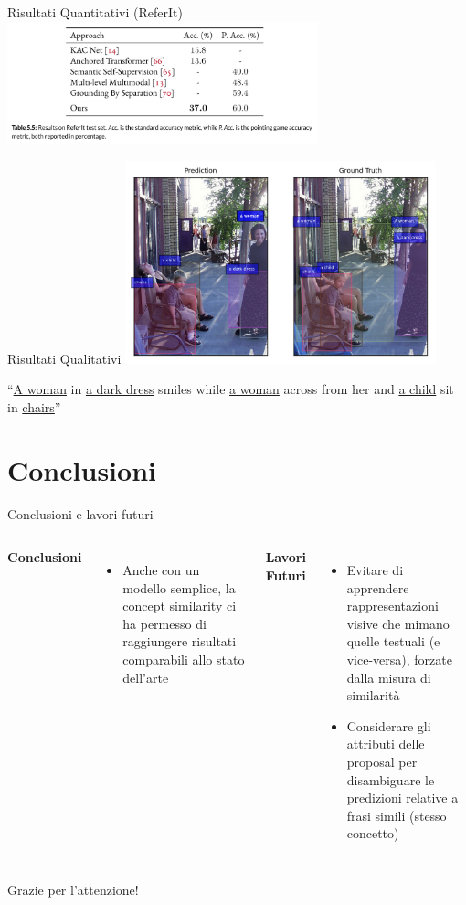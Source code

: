 \documentclass{beamer}
\begin{document}
\begin{frame}{Risultati Quantitativi (ReferIt)}
  \centering
  \includegraphics[width=9cm]{images/referit-results.png}
\end{frame}

\begin{frame}{Risultati Qualitativi}
  \centering
  \includegraphics[width=9cm]{images/similing-woman.png}
  
  ``\underline{A woman} in \underline{a dark dress} smiles while
  \underline{a woman} across from her and \underline{a child} sit in
  \underline{chairs}''
\end{frame}

\section{Conclusioni}

\begin{frame}{Conclusioni e lavori futuri}
  \begin{columns}
      \textbf{Conclusioni}
      \begin{itemize}
        \item Anche con un \alert{modello semplice}, la concept
        similarity ci ha permesso di raggiungere \alert{risultati
        comparabili} allo stato dell'arte
      \end{itemize}
      \textbf{Lavori Futuri}
      \begin{itemize}
        \item \alert{Evitare} di apprendere \alert{rappresentazioni
        visive che mimano quelle testuali} (e vice-versa), forzate
        dalla misura di similarità
        \item Considerare gli \alert{attributi} delle proposal per
        \alert{disambiguare le predizioni} relative a frasi simili
        (stesso concetto)
      \end{itemize}
  \end{columns}
\end{frame}

\begin{frame}
  \centering
  \huge
  Grazie per l'attenzione!
\end{frame}
\end{document}
